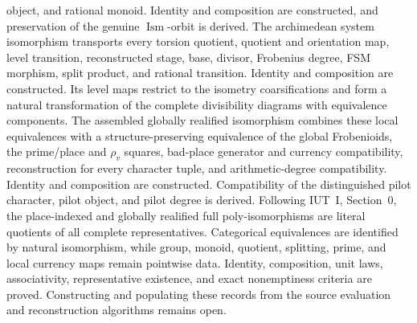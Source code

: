 \documentclass[11pt]{article}
\theoremstyle{plain}
\theoremstyle{definition}
\theoremstyle{remark}
\begin{document}
object, and rational monoid.  Identity and composition are constructed, and
preservation of the genuine \(\operatorname{Ism}\)-orbit is derived.  The
archimedean system isomorphism transports every torsion quotient, quotient
and orientation map, level transition, reconstructed stage, base, divisor,
Frobenius degree, FSM morphism, split product, and rational transition.
Identity and composition are constructed.  Its level maps restrict to the
isometry coarsifications and form a natural transformation of the complete
divisibility diagrams with equivalence components.  The assembled
globally realified isomorphism combines these local equivalences with a
structure-preserving equivalence of the global Frobenioids, the prime/place
and \(\rho_v\) squares, bad-place generator and currency compatibility,
reconstruction for every character tuple, and arithmetic-degree
compatibility.  Identity and composition are constructed.  Compatibility of
the distinguished pilot character, pilot object, and pilot degree is derived.
Following IUT~I, Section~0, the place-indexed and globally realified full
poly-isomorphisms are literal quotients of all complete representatives.
Categorical equivalences are identified by natural isomorphism, while group,
monoid, quotient, splitting, prime, and local currency maps remain pointwise
data.  Identity, composition, unit laws, associativity, representative
existence, and exact nonemptiness criteria are proved.  Constructing and
populating these records from the source evaluation and reconstruction
algorithms remains open.
\end{document}
